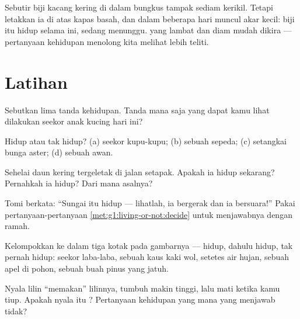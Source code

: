 \begin{remark}\label{rem:g1:living-or-not:seed}
Sebutir biji kacang kering di dalam bungkus tampak sediam kerikil.
Tetapi letakkan ia di atas kapas basah, dan dalam beberapa hari muncul
akar kecil: biji itu hidup selama ini, sedang menunggu. 
yang lambat dan diam mudah dikira  --- pertanyaan
kehidupan menolong kita melihat lebih teliti.
\end{remark}

\section{Latihan}

\begin{exercise}[$\star$]\label{exo:g1:living-or-not:1}
Sebutkan lima tanda kehidupan. Tanda mana saja yang dapat kamu lihat
dilakukan seekor anak kucing hari ini?
\end{exercise}

\begin{exercise}[$\star$]\label{exo:g1:living-or-not:2}
Hidup atau tak hidup? (a) seekor kupu-kupu; (b) sebuah sepeda; (c)
setangkai bunga aster; (d) sebuah awan.
\end{exercise}

\begin{exercise}[$\star$]\label{exo:g1:living-or-not:3}
Sehelai daun kering tergeletak di jalan setapak. Apakah ia hidup
sekarang? Pernahkah ia hidup? Dari mana asalnya?
\end{exercise}

\begin{exercise}[$\star$]\label{exo:g1:living-or-not:4}
Tomi berkata: ``Sungai itu hidup --- lihatlah, ia bergerak dan ia
bersuara!'' Pakai pertanyaan-pertanyaan \cref{met:g1:living-or-not:decide}
untuk menjawabnya dengan ramah.
\end{exercise}

\begin{exercise}[$\star$]\label{exo:g1:living-or-not:5}
Kelompokkan ke dalam tiga kotak pada gambarnya --- hidup, dahulu
hidup, tak pernah hidup: seekor laba-laba, sebuah kaus kaki wol,
setetes air hujan, sebuah apel di pohon, sebuah buah pinus yang jatuh.
\end{exercise}

\begin{exercise}[$\star$]\label{exo:g1:living-or-not:6}
Nyala lilin ``memakan'' lilinnya, tumbuh makin tinggi, lalu mati
ketika kamu tiup. Apakah nyala itu ? Pertanyaan kehidupan
yang mana yang menjawab tidak?
\end{exercise}

